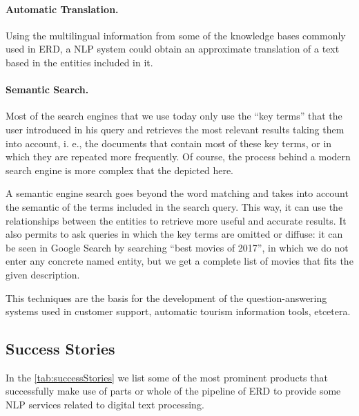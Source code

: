 \paragraph{Automatic Translation.}

Using the multilingual information from some of the knowledge bases commonly used in ERD, a NLP system could obtain an approximate translation of a text based in the entities included in it.

\paragraph{Semantic Search.}

Most of the search engines that we use today only use the ``key terms'' that the user introduced in his query and retrieves the most relevant results taking them into account, i. e., the documents that contain most of these key terms, or in which they are repeated more frequently. Of course, the process behind a modern search engine is more complex that the depicted here.

A semantic engine search goes beyond the word matching and takes into account the semantic of the terms included in the search query. This way, it can use the relationships between the entities to retrieve more useful and accurate results. It also permits to ask queries in which the key terms are omitted or diffuse: it can be seen in Google Search by searching ``best movies of 2017'', in which we do not enter any concrete named entity, but we get a complete list of movies that fits the given description.

This techniques are the basis for the development of the question-answering systems used in customer support, automatic tourism information tools, etcetera.

\subsection{Success Stories}

In the \autoref{tab:successStories} we list some of the most prominent products that successfully make use of parts or whole of the pipeline of ERD to provide some NLP services related to digital text processing.

